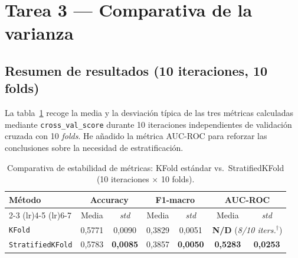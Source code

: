 \documentclass[../../__memoria.tex]{subfiles}
\begin{document}
\section[Tarea 3: Comparativa de varianza]{Tarea 3 --- Comparativa de la varianza}

\subsection{Resumen de resultados (10 iteraciones, 10 folds)}

La tabla~\ref{tab:comparativa_metricas} recoge la media y la desviación típica de las
tres métricas calculadas mediante \texttt{cross\_val\_score} durante 10
iteraciones independientes de validación cruzada con 10 \textit{folds}.
He añadido la métrica AUC-ROC para reforzar las conclusiones sobre la necesidad de estratificación.

\begin{table}[H]
  \centering
  \caption{Comparativa de estabilidad de métricas: KFold estándar vs.\ StratifiedKFold (10 iteraciones $\times$ 10 folds).}
  \label{tab:comparativa_metricas}
  \begin{tabular}{lcccccc}
    \toprule
    \multirow{2}{*}{\textbf{Método}}
     & \multicolumn{2}{c}{\textbf{Accuracy}}
     & \multicolumn{2}{c}{\textbf{F1-macro}}
     & \multicolumn{2}{c}{\textbf{AUC-ROC}}                                                                                                  \\
    \cmidrule(lr){2-3} \cmidrule(lr){4-5} \cmidrule(lr){6-7}
     & Media                                                                & \textit{std}      & Media & \textit{std} & Media & \textit{std} \\
    \midrule
    \texttt{KFold}
     & 0{,}5771                                                             & 0{,}0090
     & 0{,}3829                                                             & 0{,}0051
     & \multicolumn{2}{c}{\textbf{N/D} (\textit{8/10 iters.}$^{\dagger}$)}                                                                   \\
    \texttt{StratifiedKFold}
     & 0{,}5783                                                             & \textbf{0{,}0085}
     & 0{,}3857                                                             & \textbf{0{,}0050}
     & \textbf{0{,}5283}                                                    & \textbf{0{,}0253}                                               \\
    \bottomrule
  \end{tabular}
\end{table}
\end{document}
